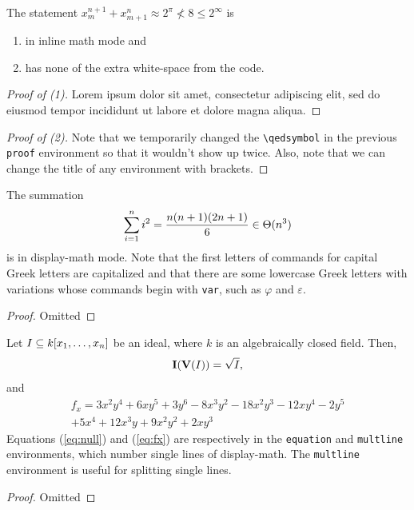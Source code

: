 \documentclass{article} 		%
\begin{document}
\begin{claim*}
	The statement $x_m^{n+1} +     x_{m+1}^n     \approx 2^\pi \not< 8 \le 2^\infty$ is 
	\begin{enumerate}
		\item
			in inline math mode and 
		\item
			has none of the extra white-space from the code. 
	\end{enumerate}
\end{claim*}
\begin{proof}[Proof of (1)]
	Lorem ipsum dolor sit amet, consectetur adipiscing elit, sed do eiusmod tempor incididunt ut labore et dolore magna aliqua. 
	\renewcommand{\qedsymbol}{}
\end{proof}
\begin{proof}[Proof of (2)]
	Note that we temporarily changed the \verb$\qedsymbol$ in the previous \texttt{proof} environment so that it wouldn't show up twice. Also, note that we can change the title of any environment with brackets. 
\end{proof}

\begin{proposition*}
	The summation
	\[
		\sum_{i=1}^n i^2 = \frac{n(n+1)(2n+1)}{6} \in \Theta(n^3)
	\]
	is in display-math mode. Note that the first letters of commands for capital Greek letters are capitalized and that there are some lowercase Greek letters with variations whose commands begin with \textnormal{\texttt{var}}, such as $\varphi$ and $\varepsilon$. 
\end{proposition*}
\begin{proof}
	Omitted
\end{proof}

\begin{corollary*}
	Let $I \subseteq k[x_1,\dots,x_n]$ be an ideal, where $k$ is an algebraically closed field. Then, 
	\begin{equation} \label{eq:null}
		\mathbf{I}(\mathbf{V}(I)) = \sqrt{I},
	\end{equation}
	and 
	\begin{multline} \label{eq:fx}
		f_x = 3x^2y^4 + 6xy^5 + 3y^6 - 8x^3y^2 - 18x^2y^3 - 12xy^4 - 2y^5 \\
		+ 5x^4 + 12x^3y + 9x^2y^2 + 2xy^3
	\end{multline}
	Equations (\ref{eq:null}) and (\ref{eq:fx}) are respectively in the \textnormal{\texttt{equation}} and \textnormal{\texttt{multline}} environments, which number single lines of display-math. The \textnormal{\texttt{multline}} environment is useful for splitting single lines. 
\end{corollary*}
\begin{proof}
	Omitted
\end{proof}
\end{document}

